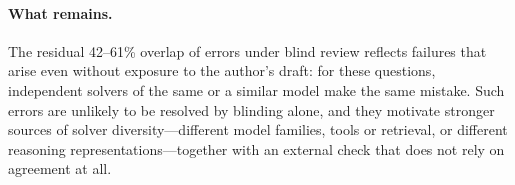 \paragraph{What remains.}
The residual 42--61\% overlap of errors under blind review reflects failures that arise even without exposure to the author's draft: for these questions, independent solvers of the same or a similar model make the same mistake.
Such errors are unlikely to be resolved by blinding alone, and they motivate stronger sources of solver diversity---different model families, tools or retrieval, or different reasoning representations---together with an external check that does not rely on agreement at all.
